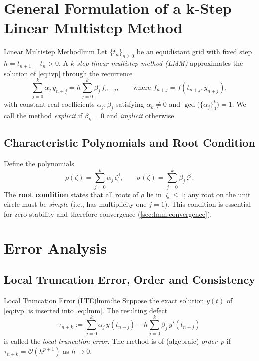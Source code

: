 \section{General Formulation of a k-Step Linear Multistep Method}
\label{sec:lmm:general}

\begin{definition}{Linear Multistep Method}{lmm}
  Let $\{t_n\}_{n\ge0}$ be an equidistant grid with fixed step $h=t_{n+1}-t_n>0$.
  A \emph{$k$-step linear multistep method (LMM)} approximates the solution of \eqref{eq:ivp} through the recurrence
  \begin{equation}
    \sum_{j=0}^{k}\alpha_j\,y_{n+j} = h\sum_{j=0}^{k}\beta_j\,f_{n+j}, \qquad\text{where }f_{n+j}=f(t_{n+j},y_{n+j}),
    \label{eq:lmm}
  \end{equation}
  with constant real coefficients $\alpha_j,\beta_j$ satisfying $\alpha_k\neq0$ and $\gcd\bigl(\{\alpha_j\}_{0}^{k}\bigr)=1$.
  We call the method \emph{explicit} if $\beta_k=0$ and \emph{implicit} otherwise.
\end{definition}

\subsection{Characteristic Polynomials and Root Condition}
\label{sec:lmm:root}
Define the polynomials
\[
  \rho(\zeta)=\sum_{j=0}^{k}\alpha_j\,\zeta^j,
  \qquad
  \sigma(\zeta)=\sum_{j=0}^{k}\beta_j\,\zeta^j.
\]
The \textbf{root condition} states that all roots of $\rho$ lie in $|\zeta|\le1$; any root on the unit circle must be \emph{simple} (i.e., has multiplicity one $j = 1$).
This condition is essential for zero-stability and therefore convergence (\autoref{sec:lmm:convergence}).

\section{Error Analysis}

\subsection{Local Truncation Error, Order and Consistency}
\label{sec:lmm:lte}

\begin{definition}{Local Truncation Error (LTE)}{lmm:lte}
  Suppose the exact solution $y(t)$ of \eqref{eq:ivp} is inserted into \eqref{eq:lmm}.
  The resulting defect
  \[
    \tau_{n+k} := \displaystyle \sum_{j=0}^{k}\alpha_j\,y(t_{n+j})-h\sum_{j=0}^{k}\beta_j\,y'(t_{n+j})
  \]
  is called the \emph{local truncation error}.
  The method is of (algebraic) \emph{order~$p$} if $\tau_{n+k}= \mathcal{O}(h^{p+1})$ as $h\to0$.
\end{definition}

